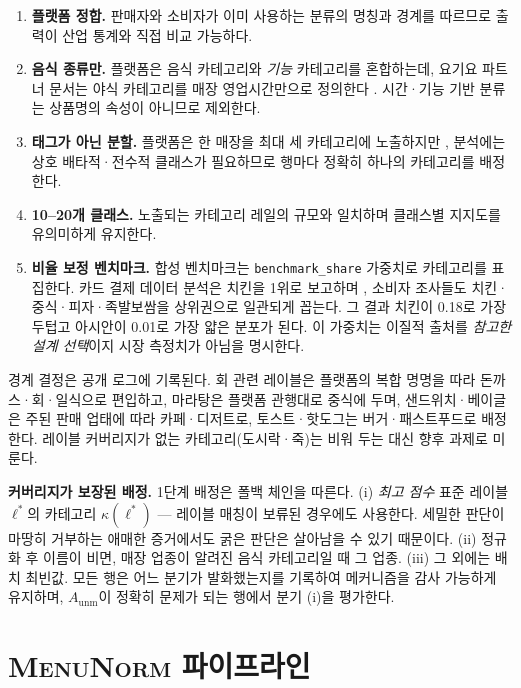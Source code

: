 \documentclass[10pt,twocolumn]{article}
\newcommand{\menunorm}{\textsc{MenuNorm}}
\begin{document}
\begin{enumerate}
\item \textbf{플랫폼 정합.} 판매자와 소비자가 이미 사용하는 분류의
  명칭과 경계를 따르므로 출력이 산업 통계와 직접 비교 가능하다.
\item \textbf{음식 종류만.} 플랫폼은 음식 카테고리와 \emph{기능}
  카테고리를 혼합하는데, 요기요 파트너 문서는 야식 카테고리를 매장
  영업시간만으로 정의한다 \cite{yogiyo}. 시간·기능 기반 분류는 상품명의
  속성이 아니므로 제외한다.
\item \textbf{태그가 아닌 분할.} 플랫폼은 한 매장을 최대 세 카테고리에
  노출하지만 \cite{yogiyo}, 분석에는 상호 배타적·전수적 클래스가
  필요하므로 행마다 정확히 하나의 카테고리를 배정한다.
\item \textbf{10--20개 클래스.} 노출되는 카테고리 레일의 규모와 일치하며
  클래스별 지지도를 유의미하게 유지한다.
\item \textbf{비율 보정 벤치마크.} 합성 벤치마크는
  \texttt{benchmark\_share} 가중치로 카테고리를 표집한다. 카드 결제
  데이터 분석은 치킨을 1위로 보고하며 \cite{hana2022}, 소비자 조사들도
  치킨·중식·피자·족발보쌈을 상위권으로 일관되게 꼽는다. 그 결과 치킨이
  0.18로 가장 두텁고 아시안이 0.01로 가장 얇은 분포가 된다. 이 가중치는
  이질적 출처를 \emph{참고한 설계 선택}이지 시장 측정치가 아님을
  명시한다.
\end{enumerate}

경계 결정은 공개 로그에 기록된다. 회 관련 레이블은 플랫폼의 복합 명명을
따라 돈까스·회·일식으로 편입하고, 마라탕은 플랫폼 관행대로 중식에 두며,
샌드위치·베이글은 주된 판매 업태에 따라 카페·디저트로, 토스트·핫도그는
버거·패스트푸드로 배정한다. 레이블 커버리지가 없는 카테고리(도시락·죽)는
비워 두는 대신 향후 과제로 미룬다.

\textbf{커버리지가 보장된 배정.} 1단계 배정은 폴백 체인을 따른다.
(i) \emph{최고 점수} 표준 레이블 $\ell^{*}$의 카테고리
$\kappa(\ell^{*})$ --- 레이블 매칭이 보류된 경우에도 사용한다. 세밀한
판단이 마땅히 거부하는 애매한 증거에서도 굵은 판단은 살아남을 수 있기
때문이다. (ii) 정규화 후 이름이 비면, 매장 업종이 알려진 음식
카테고리일 때 그 업종. (iii) 그 외에는 배치 최빈값. 모든 행은 어느
분기가 발화했는지를 기록하여 메커니즘을 감사 가능하게 유지하며,
$A_{\text{unm}}$이 정확히 문제가 되는 행에서 분기 (i)을 평가한다.

\section{\menunorm{} 파이프라인}
\label{sec:pipeline}
\end{document}
